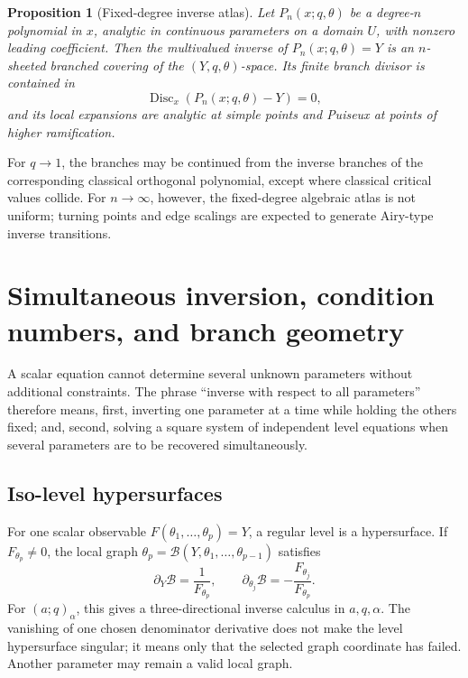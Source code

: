 \documentclass[11pt,a4paper,oneside,openany]{book}
\newtheorem{proposition}[theorem]{Proposition}
\theoremstyle{definition}
\theoremstyle{remark}
\newcommand{\Disc}{\operatorname{Disc}}
\newcommand{\branch}{\mathscr B}
\begin{document}
\begin{proposition}[Fixed-degree inverse atlas]
Let \(P_n(x;q,\theta)\) be a degree-\(n\) polynomial in \(x\), analytic in
continuous parameters on a domain \(U\), with nonzero leading coefficient.
Then the multivalued inverse of \(P_n(x;q,\theta)=Y\) is an \(n\)-sheeted
branched covering of the \((Y,q,\theta)\)-space.  Its finite branch divisor is
contained in
\begin{equation}\label{eq:polynomial-inverse-discriminant}
 \Disc_x(P_n(x;q,\theta)-Y)=0,
\end{equation}
and its local expansions are analytic at simple points and Puiseux at points
of higher ramification.
\end{proposition}

For \(q\to1\), the branches may be continued from the inverse branches of the
corresponding classical orthogonal polynomial, except where classical
critical values collide.  For \(n\to\infty\), however, the fixed-degree
algebraic atlas is not uniform; turning points and edge scalings are expected
to generate Airy-type inverse transitions.

\chapter{Simultaneous inversion, condition numbers, and branch geometry}

A scalar equation cannot determine several unknown parameters without
additional constraints.  The phrase ``inverse with respect to all
parameters'' therefore means, first, inverting one parameter at a time while
holding the others fixed; and, second, solving a square system of independent
level equations when several parameters are to be recovered simultaneously.

\section{Iso-level hypersurfaces}

For one scalar observable \(F(\theta_1,\ldots,\theta_p)=Y\), a regular level
is a hypersurface.  If \(F_{\theta_p}\ne0\), the local graph
\(\theta_p=\branch(Y,\theta_1,\ldots,\theta_{p-1})\) satisfies
\begin{equation}\label{eq:isolevel-gradient}
 \partial_Y\branch=\frac1{F_{\theta_p}},
 \qquad
 \partial_{\theta_j}\branch=-\frac{F_{\theta_j}}{F_{\theta_p}}.
\end{equation}
For \((a;q)_\alpha\), this gives a three-directional inverse calculus in
\(a,q,\alpha\).  The vanishing of one chosen denominator derivative does not
make the level hypersurface singular; it means only that the selected graph
coordinate has failed.  Another parameter may remain a valid local graph.
\end{document}
